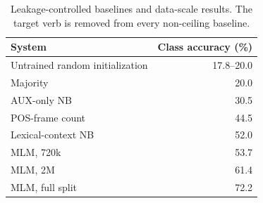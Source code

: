 \begin{table}[t]
\centering
\small
\begin{tabular}{lr}
\toprule
System & Class accuracy (\%) \\
\midrule
Untrained random initialization & 17.8--20.0 \\
Majority & 20.0 \\
AUX-only NB & 30.5 \\
POS-frame count & 44.5 \\
Lexical-context NB & 52.0 \\
MLM, 720k & 53.7 \\
MLM, 2M & 61.4 \\
MLM, full split & 72.2 \\
\bottomrule
\end{tabular}
\caption{Leakage-controlled baselines and data-scale results. The target verb is removed from every non-ceiling baseline.}
\label{tab:baselines}
\end{table}
